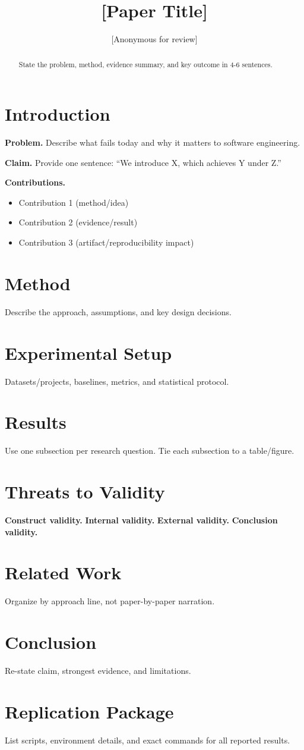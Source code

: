 \documentclass{article}
\title{[Paper Title]}
\author{[Anonymous for review]}
\date{}
\begin{document}
\maketitle

\begin{abstract}
State the problem, method, evidence summary, and key outcome in 4-6 sentences.
\end{abstract}

\section{Introduction}
\textbf{Problem.} Describe what fails today and why it matters to software engineering.

\textbf{Claim.} Provide one sentence: ``We introduce X, which achieves Y under Z.''

\textbf{Contributions.}
\begin{itemize}
  \item Contribution 1 (method/idea)
  \item Contribution 2 (evidence/result)
  \item Contribution 3 (artifact/reproducibility impact)
\end{itemize}

\section{Method}
Describe the approach, assumptions, and key design decisions.

\section{Experimental Setup}
Datasets/projects, baselines, metrics, and statistical protocol.

\section{Results}
Use one subsection per research question. Tie each subsection to a table/figure.

\section{Threats to Validity}
\textbf{Construct validity.}
\textbf{Internal validity.}
\textbf{External validity.}
\textbf{Conclusion validity.}

\section{Related Work}
Organize by approach line, not paper-by-paper narration.

\section{Conclusion}
Re-state claim, strongest evidence, and limitations.




\appendix
\section{Replication Package}
List scripts, environment details, and exact commands for all reported results.
\end{document}
